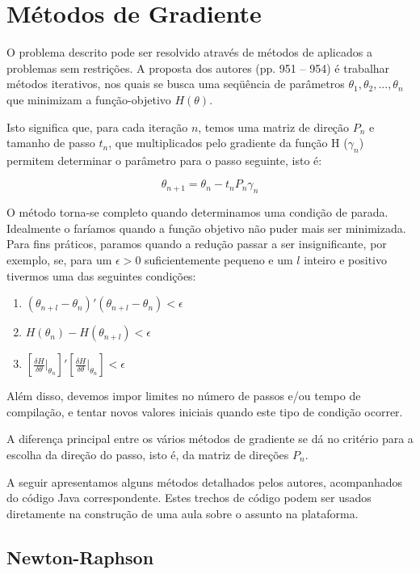 \documentclass{abnt}
\begin{document}
\section {Métodos de Gradiente}

O problema descrito pode ser resolvido através de métodos de aplicados a problemas sem restrições. A proposta dos autores (pp. 951 -- 954) é trabalhar métodos iterativos, nos quais se busca uma seqüência de parâmetros $\theta_{1}, \theta_{2}, ... , \theta_{n}$ que minimizam a função-objetivo  $H(\theta)$.

Isto significa que, para cada iteração $n$, temos uma matriz de direção $P_{n}$ e tamanho de passo $t_{n}$, que multiplicados pelo gradiente da função H ($\gamma_{n}$) permitem determinar o parâmetro para o passo seguinte, isto é:

\[ \theta_{n+1} = \theta_{n} - t_{n}P_{n}\gamma_{n} \]

O método torna-se completo quando determinamos uma condição de parada. Idealmente o faríamos quando a função objetivo não puder mais ser minimizada. Para fins práticos, paramos quando a redução passar a ser insignificante, por exemplo, se, para um $\epsilon > 0$ suficientemente pequeno e um $l$ inteiro e positivo tivermos uma das seguintes condições:

\begin{enumerate}
\item $ ( \theta_{n+l} - \theta_n )'( \theta_{n+l} - \theta_n ) < \epsilon$
\item $ H(  \theta_n )- H (\theta_{n+l} ) < \epsilon$
\item $  [\frac{\delta H}{\delta \theta}\vert_{\theta_n}]'[\frac{\delta H}{\delta \theta}\vert_{\theta_n}] < \epsilon$
\end{enumerate}

Além disso, devemos impor limites no número de passos e/ou tempo de compilação, e tentar novos valores iniciais quando este tipo de condição ocorrer.

A diferença principal entre os vários métodos de gradiente se dá no critério para a escolha da direção do passo, isto é, da matriz de direções $P_n$.

A seguir apresentamos alguns métodos detalhados pelos autores, acompanhados do código Java correspondente. Estes trechos de código podem ser usados diretamente na construção de uma aula sobre o assunto na plataforma.

\subsection{Newton-Raphson}
\end{document}
